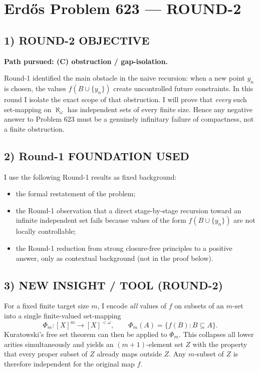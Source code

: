 \section{Erd\H{o}s Problem 623 --- ROUND-2}

\subsection*{1) ROUND-2 OBJECTIVE}

\textbf{Path pursued: (C) obstruction / gap-isolation.}

Round-1 identified the main obstacle in the naive recursion: when a new point $y_n$ is chosen, the values
$f(B\cup\{y_n\})$ create uncontrolled future constraints. In this round I isolate the exact scope of that
obstruction. I will prove that \emph{every} such set-mapping on $\aleph_\omega$ has independent sets of
every finite size. Hence any negative answer to Problem 623 must be a genuinely infinitary failure of
compactness, not a finite obstruction.

\subsection*{2) Round-1 FOUNDATION USED}

I use the following Round-1 results as fixed background:

\begin{itemize}
\item the formal restatement of the problem;
\item the Round-1 observation that a direct stage-by-stage recursion toward an infinite independent set
fails because values of the form $f(B\cup\{y_n\})$ are not locally controllable;
\item the Round-1 reduction from strong closure-free principles to a positive answer, only as contextual
background (not in the proof below).
\end{itemize}

\subsection*{3) NEW INSIGHT / TOOL (ROUND-2)}

For a fixed finite target size $m$, I encode \emph{all} values of $f$ on subsets of an $m$-set into a
single finite-valued set-mapping
\[
\Phi_m:[X]^m \to [X]^{<\omega},\qquad
\Phi_m(A)=\{f(B):B\subseteq A\}.
\]
Kuratowski's free set theorem can then be applied to $\Phi_m$.
This collapses all lower arities simultaneously and yields an $(m+1)$-element set $Z$ with the property
that every proper subset of $Z$ already maps outside $Z$. Any $m$-subset of $Z$ is therefore independent
for the original map $f$.


